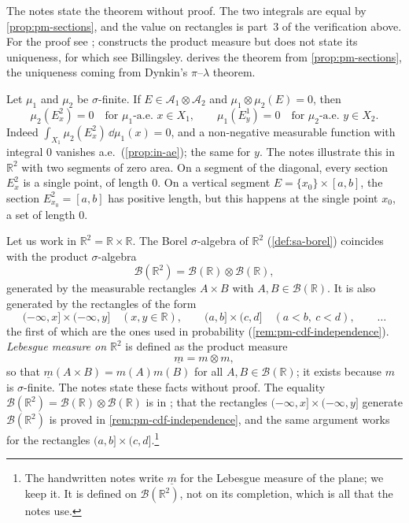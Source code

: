 The notes state the theorem without proof. The two integrals are equal by
\cref{prop:pm-sections}, and the value on rectangles is part~3 of the verification above.
For the proof see \citet[Theorem~18.2]{billingsley}; \citet[Theorem~8.6 and the definition
that follows it]{rudin-rca} constructs the product measure but does not state its uniqueness,
for which see Billingsley.  derives the theorem from
\cref{prop:pm-sections}, the uniqueness coming from Dynkin's $\pi$--$\lambda$ theorem.

\begin{remark}\label{rem:pm-null-sections}
Let $\mu_1$ and $\mu_2$ be $\sigma$-finite. If $E\in\mathcal A_1\otimes\mathcal A_2$ and
$\mu_1\otimes\mu_2(E)=0$, then
\[
  \mu_2(E^2_x)=0\quad\text{for $\mu_1$-a.e.\ }x\in X_1,\qquad
  \mu_1(E^1_y)=0\quad\text{for $\mu_2$-a.e.\ }y\in X_2 .
\]
Indeed $\int_{X_1}\mu_2(E^2_x)\,\dd\mu_1(x)=0$, and a non-negative measurable function with
integral $0$ vanishes a.e.\ (\cref{prop:in-ae}); the same for $y$. The notes illustrate this
in $\mathbb R^2$ with two segments of zero area. On a segment of the diagonal, every section
$E^2_x$ is a single point, of length $0$. On a vertical segment $E=\{x_0\}\times[a,b]$, the
section $E^2_{x_0}=[a,b]$ has positive length, but this happens at the single point $x_0$, a
set of length $0$.
\end{remark}

\begin{example}\label{rem:pm-borel-plane}
Let us work in $\mathbb R^2=\mathbb R\times\mathbb R$. The Borel $\sigma$-algebra of
$\mathbb R^2$ (\cref{def:sa-borel}) coincides with the product $\sigma$-algebra
\[
  \mathcal B(\mathbb R^2)=\mathcal B(\mathbb R)\otimes\mathcal B(\mathbb R),
\]
generated by the measurable rectangles $A\times B$ with $A,B\in\mathcal B(\mathbb R)$. It is
also generated by the rectangles of the form
\[
  (-\infty,x]\times(-\infty,y]\quad(x,y\in\mathbb R),\qquad (a,b]\times(c,d]\quad(a<b,\ c<d),\qquad\dots
\]
the first of which are the ones used in probability (\cref{rem:pm-cdf-independence}).
\emph{Lebesgue measure on $\mathbb R^2$} is defined as the product measure
\[
  \underline m=m\otimes m,
\]
so that $\underline m(A\times B)=m(A)m(B)$ for all $A,B\in\mathcal B(\mathbb R)$; it exists
because $m$ is $\sigma$-finite. The notes state these facts without proof. The equality
$\mathcal B(\mathbb R^2)=\mathcal B(\mathbb R)\otimes\mathcal B(\mathbb R)$ is in
\citet[Section~1.2]{folland}; that the rectangles $(-\infty,x]\times(-\infty,y]$ generate
$\mathcal B(\mathbb R^2)$ is proved in \cref{rem:pm-cdf-independence}, and
the same argument works for the rectangles $(a,b]\times(c,d]$.\footnote{The handwritten notes
write $\underline m$ for the Lebesgue measure of the plane; we keep it. It is defined on
$\mathcal B(\mathbb R^2)$, not on its completion, which is all that the notes use.}
\end{example}

